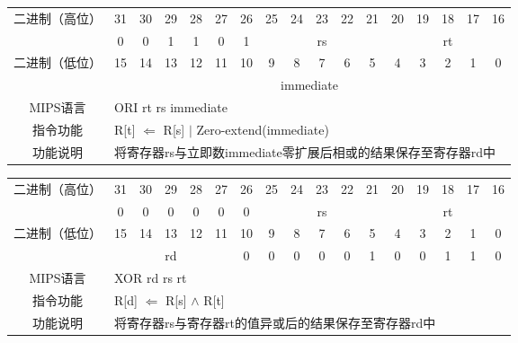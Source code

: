 \begin{table}
\begin{tabular}{|c|c|c|c|c|c|c|c|c|c|c|c|c|c|c|c|c|}
\hline
\multirow{2}{*}{二进制（高位）} &
31&30&29&28&27&26&25&24&23&22&21&20&19&18&17&16\\
\cline{2-17}
&
0&0&1&1&0&
1&
\multicolumn{5}{c|}{rs}&
\multicolumn{5}{c|}{rt}\\
\hline
\multirow{2}{*}{二进制（低位）} &
15&14&13&12&11&10&9&8&7&6&5&4&3&2&1&0\\
\cline{2-17}
&
\multicolumn{16}{c|}{immediate}\\
\hline
MIPS语言&
\multicolumn{16}{l|}{ORI rt rs immediate}\\
\hline
指令功能&
\multicolumn{16}{l|}{R[t] $\Leftarrow$ R[s] $\mid$ Zero-extend(immediate)}\\
\hline
功能说明&
\multicolumn{16}{l|}{将寄存器rs与立即数immediate零扩展后相或的结果保存至寄存器rd中}\\
\hline
\end{tabular}
\end{table}

\begin{table}
\begin{tabular}{|c|c|c|c|c|c|c|c|c|c|c|c|c|c|c|c|c|}
\hline
\multirow{2}{*}{二进制（高位）} &
31&30&29&28&27&26&25&24&23&22&21&20&19&18&17&16\\
\cline{2-17}
&
0&0&0&0&0&
0&
\multicolumn{5}{c|}{rs}&
\multicolumn{5}{c|}{rt}\\
\hline
\multirow{2}{*}{二进制（低位）} &
15&14&13&12&11&10&9&8&7&6&5&4&3&2&1&0\\
\cline{2-17}
&
\multicolumn{5}{c|}{rd}&
0&0&0&0&0&
1&0&0&1&1&
0\\
\hline
MIPS语言&
\multicolumn{16}{l|}{XOR rd rs rt}\\
\hline
指令功能&
\multicolumn{16}{l|}{R[d] $\Leftarrow$ R[s] $\wedge$ R[t]}\\
\hline
功能说明&
\multicolumn{16}{l|}{将寄存器rs与寄存器rt的值异或后的结果保存至寄存器rd中}\\
\hline
\end{tabular}
\end{table}

